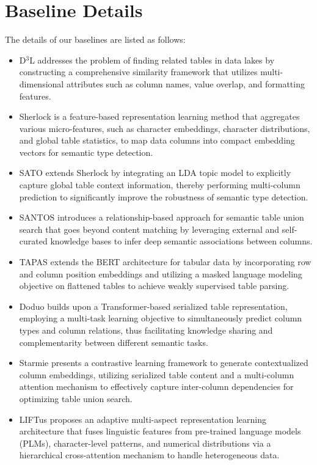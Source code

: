 \section{Baseline Details}
The details of our baselines are listed as follows:
\begin{itemize}
    \item D$^3$L \cite{bogatu2020dataset}  addresses the problem of finding related tables in data lakes by constructing a comprehensive similarity framework that utilizes multi-dimensional attributes such as column names, value overlap, and formatting features.  
    \item Sherlock \cite{hulsebos2019sherlock}  is a feature-based representation learning method that aggregates various micro-features, such as character embeddings, character distributions, and global table statistics, to map data columns into compact embedding vectors for semantic type detection. 
    \item SATO \cite{zhang2019sato} extends Sherlock by integrating an LDA topic model to explicitly capture global table context information, thereby performing multi-column prediction to significantly improve the robustness of semantic type detection. 
    \item SANTOS \cite{khatiwada2023santos} introduces a relationship-based approach for semantic table union search that goes beyond content matching by leveraging external and self-curated knowledge bases to infer deep semantic associations between columns.  
    \item TAPAS \cite{herzig2020tapas} extends the BERT architecture for tabular data by incorporating row and column position embeddings and utilizing a masked language modeling objective on flattened tables to achieve weakly supervised table parsing.  
    \item Doduo \cite{jiang2024doduo} builds upon a Transformer-based serialized table representation, employing a multi-task learning objective to simultaneously predict column types and column relations, thus facilitating knowledge sharing and complementarity between different semantic tasks.  
    \item Starmie \cite{fan2022semantics} presents a contrastive learning framework to generate contextualized column embeddings, utilizing serialized table content and a multi-column attention mechanism to effectively capture inter-column dependencies for optimizing table union search. 
    \item LIFTus \cite{qiu2025liftus} proposes an adaptive multi-aspect representation learning architecture that fuses linguistic features from pre-trained language models (PLMs), character-level patterns, and numerical distributions via a hierarchical cross-attention mechanism to handle heterogeneous data. 


\end{itemize}
